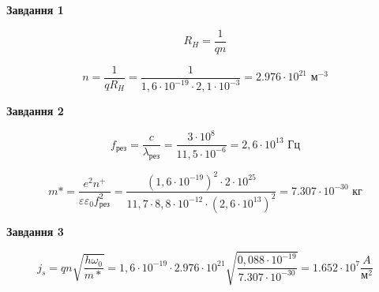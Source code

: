 \documentclass[a4paper,14pt]{extreport}
\begin{document}
\begin{center}
  \textbf{Завдання 1}
\end{center}
\begin{equation}
  R_{H} =\dfrac{1}{qn}
\end{equation}

\begin{equation}
  n = \dfrac{1}{qR_{H}}
  = \dfrac{1}{1,6\cdot 10^{-19} \cdot 2,1\cdot 10^{-3}}
  =  2.976\cdot 10^{21} \text{ м}^{-3}
\end{equation}


\begin{center}
  \textbf{Завдання 2}
\end{center}

\begin{equation}
f_{\text{рез}} = \dfrac{c}{\lambda_{\text{рез}}}
=\dfrac{3\cdot 10^{8}}{11,5\cdot 10^{-6}}
= 2,6\cdot 10^{13} \text{ Гц}
\end{equation}

\begin{equation}
m* = \dfrac{e^2n^+}{\varepsilon\varepsilon_0f_{\text{рез}}^2}
= \dfrac{(1,6\cdot10^{-19})^2 \cdot 2\cdot10^{25}}{11,7\cdot8,8\cdot10^{-12} \cdot (2,6\cdot 10^{13})^2}
= 7.307 \cdot 10^{-30} \text{ кг}
\end{equation}

\begin{center}
  \textbf{Завдання 3}
\end{center}

\begin{equation}
j_s = qn\sqrt{\dfrac{h\omega_0}{m*}} = 1,6\cdot10^{-19}\cdot  2.976\cdot 10^{21}\sqrt{\dfrac{0,088\cdot 10^{-19}}{7.307 \cdot 10^{-30}}}
= 1.652\cdot 10^{7}  \dfrac{A}{\text{м}^2}
\end{equation}
\end{document}
